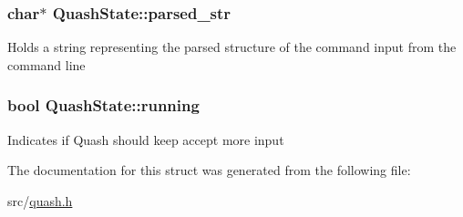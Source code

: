 \subsubsection[{\texorpdfstring{parsed\+\_\+str}{parsed\_str}}]{\setlength{\rightskip}{0pt plus 5cm}char$\ast$ Quash\+State\+::parsed\+\_\+str}\hypertarget{structQuashState_a69d0ad3cb3bf44a92459020d98814f7e}{}\label{structQuashState_a69d0ad3cb3bf44a92459020d98814f7e}
Holds a string representing the parsed structure of the command input from the command line 
\subsubsection[{\texorpdfstring{running}{running}}]{\setlength{\rightskip}{0pt plus 5cm}bool Quash\+State\+::running}\hypertarget{structQuashState_a7db3a718696ee9d0c7f8b649ccb88bb4}{}\label{structQuashState_a7db3a718696ee9d0c7f8b649ccb88bb4}
Indicates if Quash should keep accept more input 

The documentation for this struct was generated from the following file\+:\begin{DoxyCompactItemize}
\item 
src/\hyperlink{quash_8h}{quash.\+h}\end{DoxyCompactItemize}
